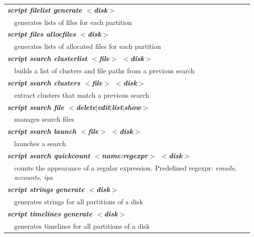 \documentclass[a4paper,11pt,oneside]{report}
\begin{document}
\begin{table}[p]
\footnotesize


\begin{tabular}{| p{1cm}  p{10cm} | }


\hline 

\multicolumn{2}{|l|}{\it \bf
script filelist generate $<$disk$>$
} \\
 & generates lists of files for each partition \\

\hline \hline

\multicolumn{2}{|l|}{\it \bf
script files allocfiles $<$disk$>$
} \\
 & generates lists of allocated files for each partition \\

\hline \hline

\multicolumn{2}{|l|}{\it \bf
script search clusterlist $<$file$>$ $<$disk$>$
} \\
 & builds a list of clusters and file paths from a previous search \\

\multicolumn{2}{|l|}{\it \bf
script search clusters $<$file$>$ $<$disk$>$
} \\
 & extract clusters that match a previous search \\

\multicolumn{2}{|l|}{\it \bf
script search file $<$delete$|$edit$|$list$|$show$>$
} \\
 &  manages search files \\

\multicolumn{2}{|l|}{\it \bf
script search launch $<$file$>$ $<$disk$>$
} \\
 & launches a search \\

\multicolumn{2}{|l|}{\it \bf
script search quickcount $<$name:regexpr$>$ $<$disk$>$
} \\
 & counts the appearance of a regular expression. Predefined regexpr: \emph{emails, accounts, ips}. \\

\hline \hline

\multicolumn{2}{|l|}{\it \bf
script strings generate $<$disk$>$
} \\
 & generates strings for all partitions of a disk \\

\hline \hline

\multicolumn{2}{|l|}{\it \bf
script timelines generate $<$disk$>$
} \\
 & generates timelines for all partitions of a disk \\


\end{tabular}
\end{table}
\end{document}
